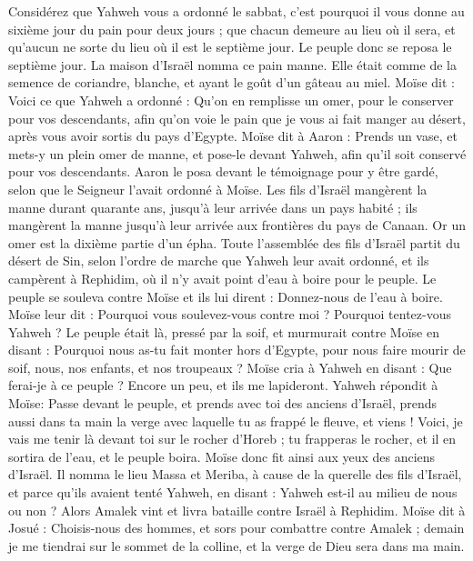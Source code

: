 \begin{multicols}{2}
Considérez que Yahweh vous a ordonné le sabbat, c'est pourquoi il vous donne au sixième jour du pain pour deux jours ; que chacun demeure au lieu où il sera, et qu'aucun ne sorte du lieu où il est le septième jour.
Le peuple donc se reposa le septième jour.
La maison d'Israël nomma ce pain manne\FTNT{}. Elle était comme de la semence de coriandre, blanche, et ayant le goût d’un gâteau au miel.
Moïse dit : Voici ce que Yahweh a ordonné : Qu'on en remplisse un omer, pour le conserver pour vos descendants, afin qu'on voie le pain que je vous ai fait manger au désert, après vous avoir sortis du pays d'Egypte.
Moïse dit à Aaron : Prends un vase, et mets-y un plein omer de manne, et pose-le devant Yahweh, afin qu’il soit conservé pour vos descendants.
Aaron le posa devant le témoignage pour y être gardé, selon que le Seigneur l'avait ordonné à Moïse.
Les fils d'Israël mangèrent la manne durant quarante ans, jusqu'à leur arrivée dans un pays habité ; ils mangèrent la manne jusqu'à leur arrivée aux frontières du pays de Canaan.
Or un omer est la dixième partie d'un épha.
\VerseOne{}Toute l'assemblée des fils d'Israël partit du désert de Sin, selon l’ordre de marche que Yahweh leur avait ordonné, et ils campèrent à Rephidim, où il n'y avait point d'eau à boire pour le peuple.
Le peuple se souleva contre Moïse et ils lui dirent : Donnez-nous de l'eau à boire. Moïse leur dit : Pourquoi vous soulevez-vous contre moi ? Pourquoi tentez-vous Yahweh\FTNT{} ?
Le peuple était là, pressé par la soif, et murmurait contre Moïse en disant : Pourquoi nous as-tu fait monter hors d'Egypte, pour nous faire mourir de soif, nous, nos enfants, et nos troupeaux ?
Moïse cria à Yahweh en disant : Que ferai-je à ce peuple ? Encore un peu, et ils me lapideront.
Yahweh répondit à Moïse: Passe devant le peuple, et prends avec toi des anciens d'Israël, prends aussi dans ta main la verge avec laquelle tu as frappé le fleuve, et viens !
Voici, je vais me tenir là devant toi sur le rocher d’Horeb ; tu frapperas le rocher, et il en sortira de l’eau, et le peuple boira. Moïse donc fit ainsi aux yeux des anciens d'Israël\FTNT{}.
Il nomma le lieu Massa et Meriba, à cause de la querelle des fils d'Israël, et parce qu'ils avaient tenté Yahweh, en disant : Yahweh est-il au milieu de nous ou non ?
Alors Amalek vint et livra bataille contre Israël à Rephidim\FTNT{}.
Moïse dit à Josué : Choisis-nous des hommes, et sors pour combattre contre Amalek ; demain je me tiendrai sur le sommet de la colline, et la verge de Dieu sera dans ma main.

\end{multicols}
